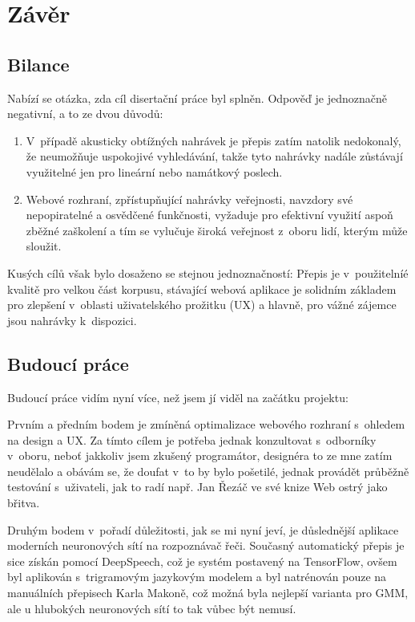 \chapter{Závěr}
\label{kap:zaver}

\section{Bilance}

Nabízí se otázka, zda cíl disertační práce byl splněn. Odpověď je jednoznačně
negativní, a to ze dvou důvodů:
\begin{enumerate}
\item{V~případě akusticky obtížných nahrávek je přepis
zatím natolik nedokonalý, že neumožňuje uspokojivé vyhledávání, takže tyto
nahrávky nadále zůstávají využitelné jen pro lineární nebo namátkový poslech.}
\item{Webové rozhraní, zpřístupňující nahrávky veřejnosti, navzdory své
nepopiratelné a osvědčené funkčnosti, vyžaduje pro efektivní využití aspoň
zběžné zaškolení a tím se vylučuje široká veřejnost z~oboru lidí, kterým může
sloužit.}
\end{enumerate}

Kusých cílů však bylo dosaženo se stejnou jednoznačností: Přepis je
v~použitelníé kvalitě pro velkou část korpusu, stávající webová aplikace je
solidním základem pro zlepšení v~oblasti uživatelského prožitku (UX) a hlavně, pro
vážné zájemce jsou nahrávky k~dispozici.

\section{Budoucí práce}

Budoucí práce vidím nyní více, než jsem jí viděl na začátku projektu:

Prvním a předním bodem je zmíněná optimalizace webového rozhraní s~ohledem na
design a UX. Za tímto cílem je potřeba jednak konzultovat s~odborníky v~oboru,
neboť jakkoliv jsem zkušený programátor, designéra to ze mne zatím neudělalo a
obávám se, že doufat v~to by bylo pošetilé, jednak provádět průběžně testování
s~uživateli, jak to radí např. Jan Řezáč ve své knize Web ostrý jako
břitva\cite{rezac2016web}.

Druhým bodem v~pořadí důležitosti, jak se mi nyní jeví, je důslednější aplikace
moderních neuronových sítí na rozpoznávač řeči. Současný automatický přepis je
sice získán pomocí DeepSpeech, což je systém postavený na TensorFlow, ovšem byl
aplikován s~trigramovým jazykovým modelem a byl natrénován pouze na manuálních
přepisech Karla Makoně, což možná byla nejlepší varianta pro GMM, ale u
hlubokých neuronových sítí to tak vůbec být nemusí.

